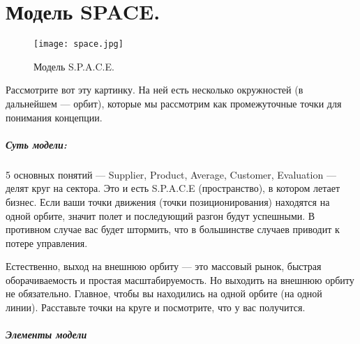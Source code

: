 \documentclass[11pt]{article}
\theoremstyle{plain} %
\theoremstyle{definition} %
\theoremstyle{remark} %
\begin{document}
\newpage

\section{Модель SPACE.}\label{erste}

\begin{wrapfigure}{r}{0.3248\linewidth}
	\texttt{[image: space.jpg]}
	\caption{Модель S.P.A.C.E.}
\end{wrapfigure}
Рассмотрите вот эту картинку. На ней есть несколько окружностей (в дальнейшем — орбит), которые мы рассмотрим как промежуточные точки для понимания концепции.

\subparagraph{Суть модели:}

5 основных понятий — Supplier, Product, Average, Customer, Evaluation — делят круг на сектора. Это и есть S.P.A.C.E (пространство), в котором летает бизнес. Если ваши точки движения (точки позиционирования) находятся на одной орбите, значит полет и последующий разгон будут успешными. В противном случае вас будет штормить, что в большинстве случаев приводит к потере управления.

\vspace{1em}
Естественно, выход на внешнюю орбиту — это массовый рынок, быстрая оборачиваемость и простая масштабируемость. Но выходить на внешнюю орбиту не обязательно. Главное, чтобы вы находились на одной орбите (на одной линии). Расставьте точки на круге и посмотрите, что у вас получится.

\subparagraph{Элементы модели}
\end{document}
